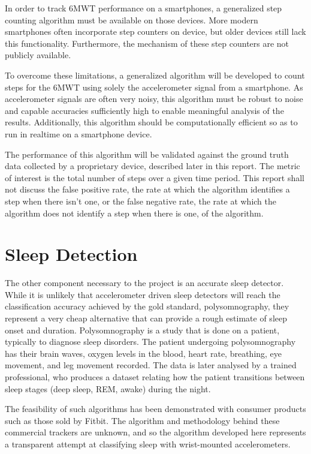             In order to track 6MWT performance on a smartphones, a generalized step counting algorithm must be available on those devices. More modern smartphones often incorporate step counters on device, but older devices still lack this functionality. Furthermore, the mechanism of these step counters are not publicly available.

            To overcome these limitations, a generalized algorithm will be developed to count steps for the 6MWT using solely the accelerometer signal from a smartphone. As accelerometer signals are often very noisy, this algorithm must be robust to noise and capable accuracies sufficiently high to enable meaningful analysis of the results. Additionally, this algorithm should be computationally efficient so as to run in realtime on a smartphone device.

            The performance of this algorithm will be validated against the ground truth data collected by a proprietary device, described later in this report. The metric of interest is the total number of steps over a given time period. This report shall not discuss the false positive rate, the rate at which the algorithm identifies a step when there isn't one, or the false negative rate, the rate at which the algorithm does not identify a step when there is one, of the algorithm.

        \section{Sleep Detection}

            The other component necessary to the project is an accurate sleep detector. While it is unlikely that accelerometer driven sleep detectors will reach the classification accuracy achieved by the gold standard, polysomnography, they represent a very cheap alternative that can provide a rough estimate of sleep onset and duration. Polysomnography is a study that is done on a patient, typically to diagnose sleep disorders. The patient undergoing polysomnography has their brain waves, oxygen levels in the blood, heart rate, breathing, eye movement, and leg movement recorded. The data is later analysed by a trained professional, who produces a dataset relating how the patient transitions between sleep stages (deep sleep, REM, awake) during the night.

            The feasibility of such algorithms has been demonstrated with consumer products such as those sold by Fitbit. The algorithm and methodology behind these commercial trackers are unknown, and so the algorithm developed here represents a transparent attempt at classifying sleep with wrist-mounted accelerometers.

